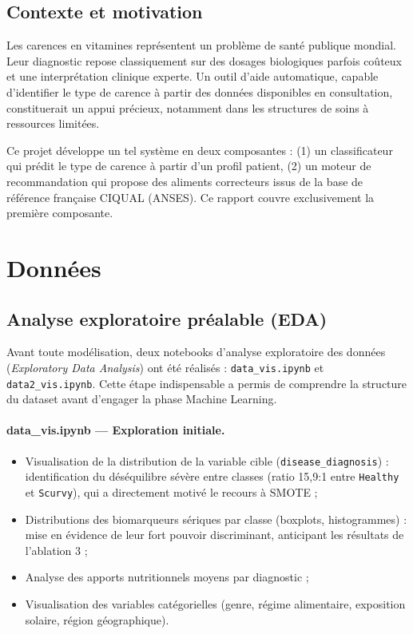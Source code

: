 \documentclass[12pt,a4paper]{article}
\begin{document}
\subsection{Contexte et motivation}

Les carences en vitamines représentent un problème de santé publique mondial.
Leur diagnostic repose classiquement sur des dosages biologiques parfois coûteux
et une interprétation clinique experte. Un outil d'aide automatique, capable
d'identifier le type de carence à partir des données disponibles en consultation,
constituerait un appui précieux, notamment dans les structures de soins à ressources
limitées.

Ce projet développe un tel système en deux composantes :
(1) un classificateur qui prédit le type de carence à partir d'un profil patient,
(2) un moteur de recommandation qui propose des aliments correcteurs issus de la
base de référence française CIQUAL (ANSES).
Ce rapport couvre exclusivement la première composante.


\section{Données}

\subsection{Analyse exploratoire préalable (EDA)}

Avant toute modélisation, deux notebooks d'analyse exploratoire des données
(\emph{Exploratory Data Analysis}) ont été réalisés : \texttt{data\_vis.ipynb}
et \texttt{data2\_vis.ipynb}. Cette étape indispensable a permis de comprendre
la structure du dataset avant d'engager la phase Machine Learning.

\paragraph{data\_vis.ipynb — Exploration initiale.}
\begin{itemize}[leftmargin=2em]
    \item Visualisation de la distribution de la variable cible
        (\texttt{disease\_diagnosis}) : identification du déséquilibre sévère
        entre classes (ratio 15,9:1 entre \texttt{Healthy} et \texttt{Scurvy}),
        qui a directement motivé le recours à SMOTE ;
    \item Distributions des biomarqueurs sériques par classe (boxplots,
        histogrammes) : mise en évidence de leur fort pouvoir discriminant,
        anticipant les résultats de l'ablation 3 ;
    \item Analyse des apports nutritionnels moyens par diagnostic ;
    \item Visualisation des variables catégorielles (genre, régime alimentaire,
        exposition solaire, région géographique).
\end{itemize}
\end{document}
